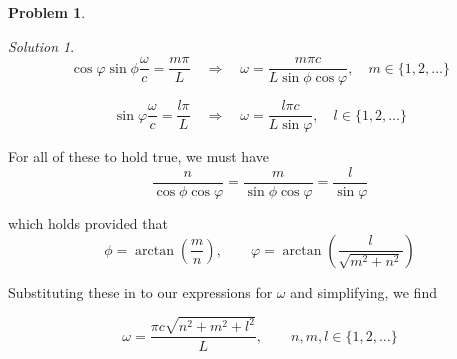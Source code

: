 \documentclass[12pt,a4paper]{article}
\theoremstyle{definition}
\newtheorem{problem}{Problem}
\theoremstyle{remark}
\newtheorem*{solution}{Solution}
\begin{document}
\begin{problem}
\begin{enumerate}[label=(\alph*)]
\begin{solution}
            $$\cos \varphi \sin \phi \frac{\omega}{c} = \frac{m \pi}{L} \quad \Rightarrow \quad \omega = \frac{m \pi c}{L\sin \phi \cos \varphi}, \quad m \in \{1, 2, \dots \}$$

            $$\sin \varphi \frac{\omega}{c} = \frac{l \pi}{L} \quad \Rightarrow \quad \omega = \frac{l \pi c}{L\sin \varphi }, \quad l \in \{1, 2, \dots \}$$

            For all of these to hold true, we must have $$\frac{n}{\cos \phi \cos \varphi} = \frac{m}{\sin \phi \cos \varphi} = \frac{l}{\sin \varphi}$$

            which holds provided that $$\phi = \arctan\left( \frac{m}{n}\right), \qquad \varphi = \arctan\left( \frac{l}{\sqrt{m^2 + n^2}} \right)$$

            Substituting these in to our expressions for $\omega$ and simplifying, we find 

            $$\omega = \frac{\pi c \sqrt{n^2 + m^2 + l^2}}{L}, \qquad n, m, l \in \{1, 2, \dots \}$$
        \end{solution}
    \end{enumerate}
\end{problem}
\end{document}
